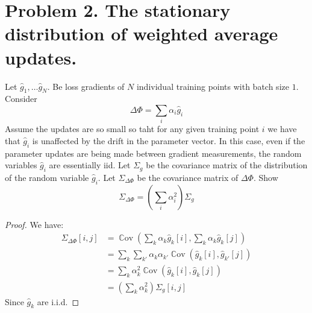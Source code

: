 \documentclass{amsart}
\newcommand{\Cov}[1]{\operatorname{\mathbb{C}ov}\left(#1\right)}
\theoremstyle{definition}
\begin{document}
\section*{Problem 2. The stationary distribution of weighted average updates. }
Let $\hat{g}_1, \ldots \hat{g}_N$. Be loss gradients of $N$ individual training points with batch size $1$. 
Consider 
\[
\Delta \Phi = \sum_{i} \alpha_i \hat{g}_i
\]
Assume the updates are so small so taht for any given training point $i$ we have that $\hat{g}_i$ is unaffected by the drift in the parameter vector.
In this case, even if the parameter updates are being made between gradient measurements, the random variables $\hat{g}_i$ are essentially iid. 
Let $\Sigma_g$ be the covariance matrix of the distribution of the random variable $\hat{g}_i$. 
Let $\Sigma_{\Delta \Phi}$ be the covariance matrix of $\Delta \Phi$. 
Show
\[
\Sigma_{\Delta\Phi} = \left(
\sum_{i} \alpha_i^2
\right) \Sigma_g
\]
\begin{proof}
  We have:
  \begin{align*}
    \Sigma_{\Delta\Phi}[i,j] &= \Cov{\sum_{k} \alpha_k \hat{g}_k[i], \sum_{k} \alpha_k \hat{g}_k[j]} \\
    &= \sum_{k} \sum_{k'} \alpha_k \alpha_{k'} \Cov{\hat{g}_k[i], \hat{g}_{k'}[j]} \\
    &= \sum_{k} \alpha_k^2 \Cov{\hat{g}_k[i], \hat{g}_k[j]} \\
    &= \left(\sum_{k} \alpha_k^2\right) \Sigma_g[i,j]
  \end{align*}
  Since $\hat{g}_k$ are i.i.d.
\end{proof}
\end{document}

